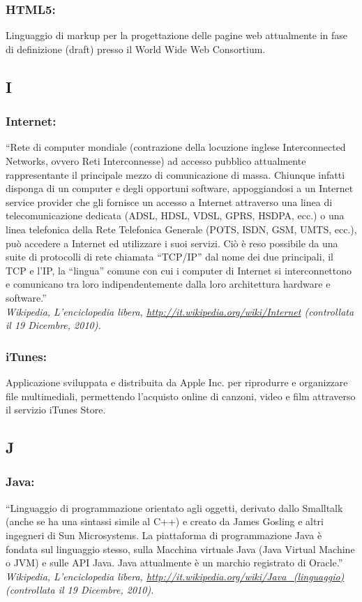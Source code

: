 \subsubsection*{HTML5:} Linguaggio di markup per la progettazione delle pagine
web attualmente in fase di definizione (draft) presso il World Wide Web Consortium.

\subsection*{\huge{I}}
\subsubsection*{Internet:}  ``Rete di computer mondiale (contrazione della
locuzione inglese Interconnected Networks, ovvero Reti Interconnesse) ad accesso pubblico
attualmente rappresentante il principale mezzo di comunicazione di massa.
Chiunque infatti disponga di un computer e degli opportuni software,
appoggiandosi a un Internet service provider che gli fornisce un accesso a
Internet attraverso una linea di telecomunicazione dedicata (ADSL, HDSL, VDSL,
GPRS, HSDPA, ecc.) o una linea telefonica della Rete Telefonica Generale (POTS,
ISDN, GSM, UMTS, ecc.), pu\`o accedere a Internet ed utilizzare i suoi servizi.
Ci\`o \`e reso possibile da una suite di protocolli di rete chiamata ``TCP/IP'' dal
nome dei due principali, il TCP e l'IP, la ``lingua'' comune con cui i computer
di Internet si interconnettono e comunicano tra loro indipendentemente dalla loro
architettura hardware e software.'' \\ 
\emph{Wikipedia, L'enciclopedia libera,
\url{http://it.wikipedia.org/wiki/Internet} (controllata il 19 Dicembre, 2010).}

\subsubsection*{iTunes:} Applicazione sviluppata e distribuita da Apple Inc. per
riprodurre e organizzare file multimediali, permettendo l'acquisto online di canzoni, video e
film attraverso il servizio iTunes Store.

\subsection*{\huge{J}}
\subsubsection*{Java:} ``Linguaggio di programmazione orientato agli oggetti,
derivato dallo Smalltalk (anche se ha una sintassi simile al C++) e creato da
James Gosling e altri ingegneri di Sun Microsystems. La piattaforma di
programmazione Java \`e fondata sul linguaggio stesso, sulla Macchina virtuale
Java (Java Virtual Machine o JVM) e sulle API Java. Java attualmente \`e un
marchio registrato di Oracle.''\\
\emph{Wikipedia, L'enciclopedia libera,
\url{http://it.wikipedia.org/wiki/Java_(linguaggio)} (controllata il 19
Dicembre, 2010).}

